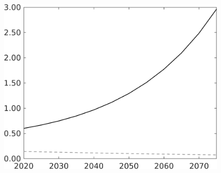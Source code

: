 \documentclass[12pt]{article}
\begin{document}
\begin{figure}[h!!]
\begin{minipage}[]{0.32\textwidth}
	\end{minipage}	
	\begin{minipage}[]{0.32\textwidth}
		\includegraphics[width=1\textwidth]{../../codding_model/own_basedOnFried/optimalPol_010922_revision/figures/all_13Sept22/LevTaufNoTauf_TaulCalib_regime0_LgLf_spillover0_nsk1_xgr1_knspil1_sep1_LFlimit0_emsbase0_countec0_GovRev0_etaa0.79_lgd0.png}
	\end{minipage}	
\end{figure}
\end{document}
